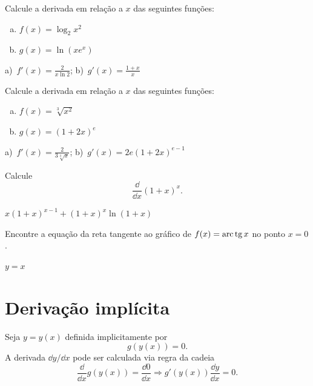 \begin{exer}
  Calcule a derivada em relação a $x$ das seguintes funções:
  \begin{enumerate}[a)]
  \item $f(x) = \log_2 x^2$
  \item $g(x) = \ln (xe^x)$
  \end{enumerate}
\end{exer}
\begin{resp}
  a)~$\displaystyle f'(x) = \frac{2}{x\ln 2}$; b)~$g'(x) = \frac{1+x}{x}$
\end{resp}

\begin{exer}
  Calcule a derivada em relação a $x$ das seguintes funções:
  \begin{enumerate}[a)]
  \item $f(x) = \sqrt[3]{x^2}$
  \item $g(x) = (1+2x)^e$
  \end{enumerate}
\end{exer}
\begin{resp}
  a)~$\displaystyle f'(x) = \frac{2}{3\sqrt[3]{x}}$; b)~$g'(x) = 2e(1+2x)^{e-1}$
\end{resp}

\begin{exer}
  Calcule
  \begin{equation}
    \frac{\dd}{\dd x} (1+x)^x.
  \end{equation}
\end{exer}
\begin{resp}
  $x(1+x)^{x-1} + (1+x)^x\ln(1+x)$
\end{resp}

\begin{exer}
  Encontre a equação da reta tangente ao gráfico de $f(x) = \operatorname{arc}\operatorname{tg} x$ no ponto $x=0$.
\end{exer}
\begin{resp}
  $y=x$
\end{resp}

\section{Derivação implícita}\label{cap_deriv_sec_derimp}

Seja $y = y(x)$ definida implicitamente por
\begin{equation}
  g(y(x)) = 0.
\end{equation}
A derivada $\dd y/\dd x$ pode ser calculada via regra da cadeia
\begin{equation}
  \frac{\dd}{\dd x}g(y(x)) = \frac{\dd 0}{\dd x} \Rightarrow g'(y(x))\frac{\dd y}{\dd x} = 0.
\end{equation}

